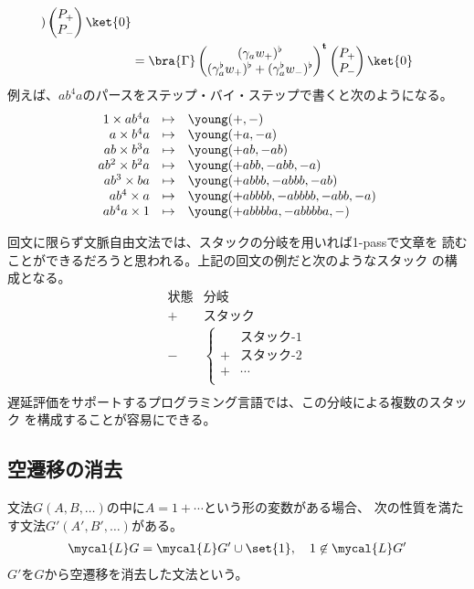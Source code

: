 {\begin{equation*}
\begin{split}
\begin{pmatrix}
			\end{pmatrix}\pvec{P_+}{P_-}\ket{0} \\
		&= \bra{\Gamma}\pvec{(\gamma_aw_+)^\flat}
			{(\gamma_a^\flat w_+)^\flat + (\gamma_a^\flat w_-)^\flat}^\tran
			\pvec{P_+}{P_-}\ket{0} \\
	\end{split}\end{equation*}
	例えば、$ab^4a$のパースをステップ・バイ・ステップで書くと次のようになる。
	\begin{equation*}\begin{array}{rcll}
		1\times ab^4a &\mapsto& \young(+,-) \\
		a\times b^4a &\mapsto& \young(+a,-a) \\
		ab\times b^3a &\mapsto& \young(+ab,-ab) \\
		ab^2\times b^2a &\mapsto& \young(+abb,-abb,-a) \\
		ab^3\times ba &\mapsto& \young(+abbb,-abbb,-ab) \\
		ab^4\times a &\mapsto& \young(+abbbb,-abbbb,-abb,-a) \\
		ab^4a\times 1 &\mapsto& \young(+abbbba,-abbbba,-) \\
	\end{array}\end{equation*}

	回文に限らず文脈自由文法では、スタックの分岐を用いれば1-passで文章を
	読むことができるだろうと思われる。上記の回文の例だと次のようなスタック
	の構成となる。
	\begin{equation*}\begin{array}{rcll}
		\text{状態} & \text{分岐} \\
		+ & \text{スタック} \\
		- & \left\{\begin{split}
			& \text{スタック-1} \\
			+ & \text{スタック-2} \\
			+ & \cdots \\
		\end{split}\right. \\
	\end{array}\end{equation*}
	遅延評価をサポートするプログラミング言語では、この分岐による複数のスタック
	を構成することが容易にできる。
\subsection{空遷移の消去}\label{s2:空遷移の消去} %
	文法$G(A,B,\dots)$の中に$A=1+\cdots$という形の変数がある場合、
	次の性質を満たす文法$G'(A',B',\dots)$がある。
	\begin{equation*}\begin{split}
		\mycal{L}G = \mycal{L}G' \cup \set{1},\quad 1\not\in\mycal{L}G'
	\end{split}\end{equation*}
	$G'$を$G$から空遷移を消去した文法という。

}

